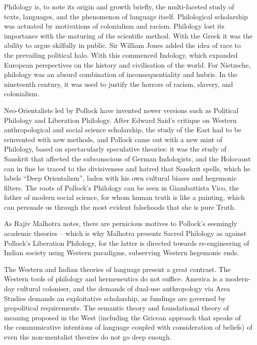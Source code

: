 Philology is, to note its origin and growth briefly, the multi-faceted study of texts, languages, and the phenomenon of language itself. Philological scholarship was actuated by motivations of colonialism and racism. Philology lost its importance with the maturing of the scientific method. With the Greek it was the ability to argue skilfully in public. Sir William Jones added the idea of race to the prevailing political halo. With this commenced Indology, which expanded European perspectives on the history and civilisation of the world. For Nietzsche, philology was an absurd combination of inconsequentiality and hubris. In the nineteenth century, it was used to justify the horrors of racism, slavery, and colonialism. 

Neo-Orientalists led by Pollock have invented newer versions such as Political Philology and Liberation Philology. After Edward Said’s critique on Western anthropological and social science scholarship, the study of the East had to be reinvented with new methods, and Pollock came out with a new mint of Philology, based on spectacularly speculative theories: it was the study of Sanskrit that affected the subconscious of German Indologists, and the Holocaust can in fine be traced to the divisiveness and hatred that Sanskrit spells, which he labels “Deep Orientalism”, laden with his own cultural biases and hegemonic filters. The roots of Pollock’s Philology can be seen in Giambattista Vico, the father of modern social science, for whom human truth is like a painting, which can persuade us through the most evident falsehoods that she is pure Truth. 

As Rajiv Malhotra notes, there are pernicious motives to Pollock’s seemingly academic theories – which is why Malhotra presents Sacred Philology as against Pollock’s Liberation Philology, for the latter is directed towards re-engineering of Indian society using Western paradigms, subserving Western hegemonic ends.

The Western and Indian theories of language present a great contrast. The Western tools of philology and hermeneutics do not suffice. America is a modern-day cultural coloniser, and the demands of dual-use anthropology via Area Studies demands an exploitative scholarship, as fundings are governed by geopolitical requirements. The semantic theory and foundational theory of meaning proposed in the West (including the Gricean approach that speaks of the communicative intentions of language coupled with consideration of beliefs) of even the non-mentalist theories do not go deep enough.

